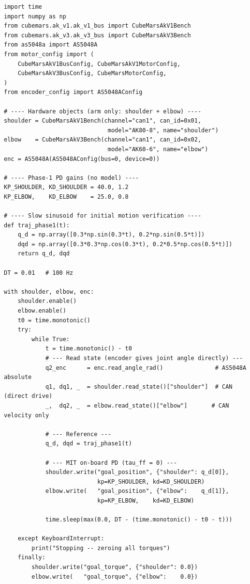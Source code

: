 \documentclass[11pt,a4paper]{article}
\begin{document}
\begin{lstlisting}[caption={Phase~1 arm-only loop: MIT PD for shoulder + elbow, no model.}]
import time
import numpy as np
from cubemars.ak_v1.ak_v1_bus import CubeMarsAkV1Bench
from cubemars.ak_v3.ak_v3_bus import CubeMarsAkV3Bench
from as5048a import AS5048A
from motor_config import (
    CubeMarsAkV1BusConfig, CubeMarsAkV1MotorConfig,
    CubeMarsAkV3BusConfig, CubeMarsMotorConfig,
)
from encoder_config import AS5048AConfig

# ---- Hardware objects (arm only: shoulder + elbow) ----
shoulder = CubeMarsAkV1Bench(channel="can1", can_id=0x01,
                              model="AK80-8", name="shoulder")
elbow    = CubeMarsAkV3Bench(channel="can1", can_id=0x02,
                              model="AK60-6", name="elbow")
enc = AS5048A(AS5048AConfig(bus=0, device=0))

# ---- Phase-1 PD gains (no model) ----
KP_SHOULDER, KD_SHOULDER = 40.0, 1.2
KP_ELBOW,    KD_ELBOW    = 25.0, 0.8

# ---- Slow sinusoid for initial motion verification ----
def traj_phase1(t):
    q_d = np.array([0.3*np.sin(0.3*t), 0.2*np.sin(0.5*t)])
    dqd = np.array([0.3*0.3*np.cos(0.3*t), 0.2*0.5*np.cos(0.5*t)])
    return q_d, dqd

DT = 0.01   # 100 Hz

with shoulder, elbow, enc:
    shoulder.enable()
    elbow.enable()
    t0 = time.monotonic()
    try:
        while True:
            t = time.monotonic() - t0
            # --- Read state (encoder gives joint angle directly) ---
            q2_enc      = enc.read_angle_rad()               # AS5048A absolute
            q1, dq1, _  = shoulder.read_state()["shoulder"]  # CAN (direct drive)
            _,  dq2, _  = elbow.read_state()["elbow"]       # CAN velocity only

            # --- Reference ---
            q_d, dqd = traj_phase1(t)

            # --- MIT on-board PD (tau_ff = 0) ---
            shoulder.write("goal_position", {"shoulder": q_d[0]},
                           kp=KP_SHOULDER, kd=KD_SHOULDER)
            elbow.write(   "goal_position", {"elbow":    q_d[1]},
                           kp=KP_ELBOW,    kd=KD_ELBOW)

            time.sleep(max(0.0, DT - (time.monotonic() - t0 - t)))

    except KeyboardInterrupt:
        print("Stopping -- zeroing all torques")
    finally:
        shoulder.write("goal_torque", {"shoulder": 0.0})
        elbow.write(   "goal_torque", {"elbow":    0.0})
\end{lstlisting}
\end{document}
